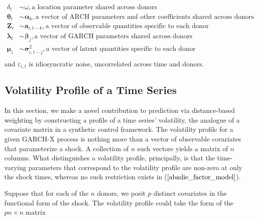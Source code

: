 \documentclass[11pt]{article}
\theoremstyle{definition}
\begin{document}
\begin{align*}
\delta_{t} & \sim \omega,  \text{a location parameter shared across donors}\\
\boldsymbol\theta_{t} & \sim \boldsymbol\alpha_{k},  \text{a vector of ARCH parameters and other coefficients shared across donors} \\
\textbf{Z}_{i} & \sim \boldsymbol a_{i,t-k}, \text{a vector of observable quantities specific to each donor} \\
\boldsymbol \lambda_{t} & \sim \boldsymbol\beta_{j}, \text{a vector of GARCH parameters shared across donors} \\
\boldsymbol \mu_{i} & \sim \boldsymbol \sigma_{i,t-j}^{2}, \text{a vector of latent quantities specific to each donor}   \\
\end{align*}
and $\varepsilon_{i,t}$ is idiosyncratic noise, uncorrelated across time and donors.

    \subsection{Volatility Profile of a Time Series}
    \label{Volatility Shock Profile of a Time Series}
    
    In this section, we make a novel contribution to prediction via distance-based weighting by constructing a profile of a time series' volatility, the analogue of a covariate matrix in a synthetic control framework.  The volatility profile for a given GARCH-X process is nothing more than a vector of observable covariates that parameterize a shock.  A collection of $n$ such vectors yields a matrix of $n$ columns.  What distinguishes a volatility profile, principally, is that the time-varying parameters that correspond to the volatility profile are non-zero at only the shock times, whereas no such restriction exists in ($\ref{abadie_factor_model}$).  
    
    Suppose that for each of the $n$ donors, we posit $p$ distinct covariates in the functional form of the shock.  The volatility profile could take the form of the $pn \times n$ matrix 
\end{document}
